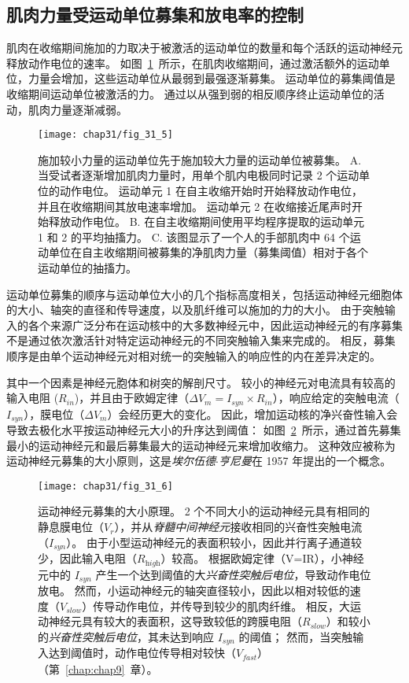 \subsection{肌肉力量受运动单位募集和放电率的控制}

肌肉在收缩期间施加的力取决于被激活的运动单位的数量和每个活跃的运动神经元释放动作电位的速率。
如图~\ref{fig:31_5}~所示，在肌肉收缩期间，通过激活额外的运动单位，力量会增加，这些运动单位从最弱到最强逐渐募集。
运动单位的募集阈值是收缩期间运动单位被激活的力。
通过以从强到弱的相反顺序终止运动单位的活动，肌肉力量逐渐减弱。


\begin{figure}[htbp]
	\centering
	\texttt{[image: chap31/fig\_31\_5]}
	\caption{施加较小力量的运动单位先于施加较大力量的运动单位被募集\cite{desmedt1977ballistic,milner1973orderly}。
	A. 当受试者逐渐增加肌肉力量时，用单个肌内电极同时记录 2 个运动单位的动作电位。
	运动单元 1 在自主收缩开始时开始释放动作电位，并且在收缩期间其放电速率增加。
	运动单元 2 在收缩接近尾声时开始释放动作电位。
	B. 在自主收缩期间使用平均程序提取的运动单元 1 和 2 的平均抽搐力。
	C. 该图显示了一个人的手部肌肉中 64 个运动单位在自主收缩期间被募集的净肌肉力量（募集阈值）相对于各个运动单位的抽搐力。}
	\label{fig:31_5}
\end{figure}


运动单位募集的顺序与运动单位大小的几个指标高度相关，包括运动神经元细胞体的大小、轴突的直径和传导速度，以及肌纤维可以施加的力的大小。
由于突触输入的各个来源广泛分布在运动核中的大多数神经元中，因此运动神经元的有序募集不是通过依次激活针对特定运动神经元的不同突触输入集来完成的。
相反，募集顺序是由单个运动神经元对相对统一的突触输入的响应性的内在差异决定的。


其中一个因素是神经元胞体和树突的解剖尺寸。
较小的神经元对电流具有较高的输入电阻 ($ R_{in} $)，并且由于欧姆定律（$ \Delta V_m = I_{\textit{syn}} \times R_{in} $），响应给定的突触电流（$ I_{\textit{syn}} $），膜电位（$ \Delta V_m $）会经历更大的变化。
因此，增加运动核的净兴奋性输入会导致去极化水平按运动神经元大小的升序达到阈值：
如图~\ref{fig:31_6}~所示，通过首先募集最小的运动神经元和最后募集最大的运动神经元来增加收缩力。
这种效应被称为运动神经元募集的大小原则，这是\textit{埃尔伍德$\cdot$亨尼曼}在 1957 年提出的一个概念。


\begin{figure}[htbp]
	\centering
	\texttt{[image: chap31/fig\_31\_6]}
	\caption{运动神经元募集的大小原理。
	2 个不同大小的运动神经元具有相同的静息膜电位（$ V_r $），并从\textit{脊髓中间神经元}接收相同的兴奋性突触电流（$ I_{\textit{syn}} $）。
	由于小型运动神经元的表面积较小，因此并行离子通道较少，因此输入电阻（$ R_{\textit{high}} $）较高。
	根据欧姆定律（V=IR），小神经元中的 $ I_{\textit{syn}} $ 产生一个达到阈值的大\textit{兴奋性突触后电位}，导致动作电位放电。
	然而，小运动神经元的轴突直径较小，因此以相对较低的速度（$ V_{\textit{slow}} $）传导动作电位，并传导到较少的肌肉纤维。
	相反，大运动神经元具有较大的表面积，这导致较低的跨膜电阻（$R_{\textit{slow}}$）和较小的\textit{兴奋性突触后电位}，其未达到响应 $ I_{\textit{syn}} $ 的阈值；
	然而，当突触输入达到阈值时，动作电位传导相对较快（$ V_{\textit{fast}} $）（第~\ref{chap:chap9}~章）。}
	\label{fig:31_6}
\end{figure}


